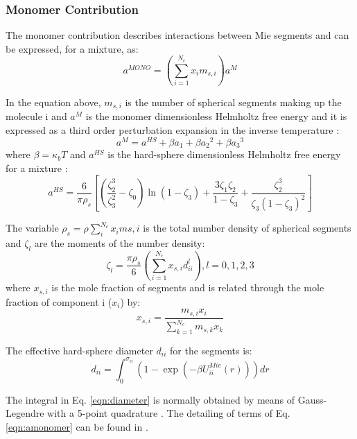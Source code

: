 \subsubsection{Monomer Contribution}

The monomer contribution describes interactions between Mie segments and can be expressed, for a mixture, as:
\begin{equation}
a^{MONO} = \left(\sum_{i=1}^{N_{c}} x_{i}m_{s,i} \right)a^{M}
\label{eqn:amonomer}
\end{equation}

In the equation above, $m_{s,i}$ is the number of spherical segments making up the molecule i and $a^{M}$  is the monomer dimensionless Helmholtz free energy and it is expressed as a third order perturbation expansion in the inverse temperature \cite{bh1976}:
\begin{equation}
a^{M} = a^{HS}+\beta{a_{1}}+\beta{a_{2}}^2+\beta{a_{3}}^3 
\label{eqn:aM}
\end{equation}
where $\beta=\kappa_{b}T$ and $a^{HS}$ is the hard-sphere dimensionless Helmholtz free energy for a mixture :
\begin{equation}
a^{HS} = \frac{6}{\pi\rho_{s}}\left[\left(\frac{\zeta^3_2}{\zeta^2_3}-\zeta_0 \right)\ln(1-\zeta_3)+\frac{3\zeta_{1}\zeta_{2}}{1-\zeta_3}+ \frac{\zeta^3_2}{\zeta_{3}(1-\zeta_3)^2}\right]
\label{eqn:hs}
\end{equation}

The variable $\rho_{s}=\rho\sum_{i}^{N_c} x_{i}m{s,i}$ is the total number density of spherical segments and $\zeta_l$ are the moments of the number density:
\begin{equation}
\zeta_l = \frac{\pi\rho_s}{6}\left(\sum_{i=1}^{N_c} x_{s,i}d^l_{ii} \right), l = 0,1,2,3
\label{eqn:zetal}
\end{equation}
where $x_{s,i}$ is the mole fraction of segments and is related through the mole fraction of component i ($x_i$) by:
\begin{equation}
x_{s,i} = \frac{m_{s,i}x_i}{\sum_{k=1}^{N_c} m_{s,k}x_{k} }
\label{eqn:xsi}
\end{equation}


The effective hard-sphere diameter $d_{ii}$ for the segments is:
\begin{equation}
d_{ii} =\int_{0}^{\sigma_{ii}} ( 1 - \exp(-\beta U^{Mie}_{ii}(r)) ) dr
\label{eqn:diameter}
\end{equation}


The integral in Eq. \eqref{eqn:diameter} is normally obtained by means of Gauss-Legendre with a 5-point quadrature \cite{papa2014}. The detailing of terms of Eq. \eqref{eqn:amonomer} can be found in .

